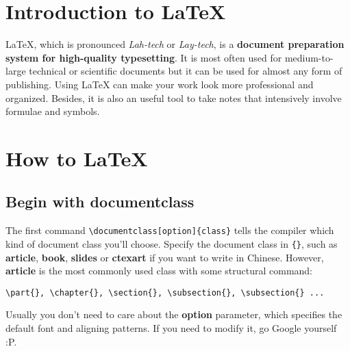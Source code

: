 \documentclass[]{article}
\title{\ttfamily{\LaTeX \;Intro Manual}}
\author{\ttfamily{jan\_chen}}
\date{\ttfamily{September 2023}}
\begin{document}
\maketitle
\tableofcontents

\section{Introduction to \LaTeX}

LaTeX, which is pronounced 
\textit{Lah-tech} or \textit{Lay-tech}, is a \textbf{document preparation system for high-quality typesetting}. It is most often used for medium-to-large technical or scientific documents but it can be used for almost any form of publishing. Using LaTeX can make your work look more professional and organized. Besides, it is also an useful tool to take notes that intensively involve formulae and symbols.

\section{How to \LaTeX }

\subsection{Begin with documentclass}
The first command \verb|\documentclass[option]{class}| tells the compiler which kind of document class you'll choose. Specify the document class in \verb|{}|, such as \textbf{article}, \textbf{book}, \textbf{slides} or \textbf{ctexart} if you want to write in Chinese. However, \textbf{article} is the most commonly used class with some structural command:
\begin{lstlisting}[basicstyle = \ttfamily]
\part{}, \chapter{}, \section{}, \subsection{}, \subsection{} ...
\end{lstlisting}
Usually you don't need to care about the \textbf{option} parameter, which specifies the default font and aligning patterns. If you need to modify it, go Google yourself :P.
\end{document}
